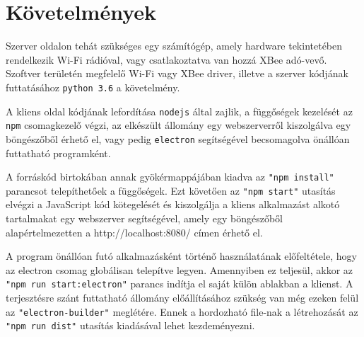 \section{Követelmények}

Szerver oldalon tehát szükséges egy számítógép, amely hardware tekintetében
rendelkezik Wi-Fi rádióval, vagy csatlakoztatva van hozzá XBee adó-vevő.
Szoftver területén megfelelő Wi-Fi vagy XBee driver, illetve a szerver
kódjának futtatásához \verb|python 3.6| a követelmény.

A kliens oldal kódjának lefordítása \verb|nodejs| által zajlik, a függőségek
kezelését az \verb|npm| csomagkezelő végzi, az elkészült állomány egy
webszerverről kiszolgálva egy böngészőből érhető el, vagy pedig \verb|electron|
segítségével becsomagolva önállóan futtatható programként.

A forráskód birtokában annak gyökérmappájában kiadva az \verb|"npm install"|
parancsot telepíthetőek a függőségek. Ezt követően az \verb|"npm start"|
utasítás elvégzi a JavaScript kód kötegelését és kiszolgálja a kliens
alkalmazást alkotó tartalmakat egy webszerver segítségével, amely egy
böngészőből alapértelmezetten a http://localhost:8080/ címen érhető el.

A program önállóan futó alkalmazásként történő használatának előfeltétele, hogy
az electron csomag globálisan telepítve legyen. Amennyiben ez teljesül, akkor az
\verb|"npm run start:electron"| parancs indítja el saját külön ablakban a
klienst. A terjesztésre szánt futtatható állomány előállításához szükség van még
ezeken felül az \verb|"electron-builder"| meglétére. Ennek a hordozható file-nak
a létrehozását az \verb|"npm run dist"| utasítás kiadásával lehet kezdeményezni.

